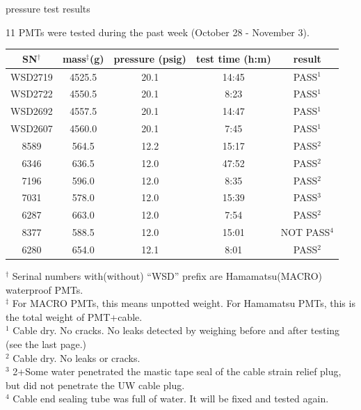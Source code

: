 \documentclass{beamer}
\begin{document}
\begin{frame}{pressure test results}
	\begin{center}
		\small
		11 PMTs were tested during the past week (October 28 - November 3).
	\end{center}
\begin{table}
\small
{}
\begin{tabular}{c|c|c|c|c}
	SN$^\dagger$ & mass$^\ddag$(g) & pressure (psig) & test time (h:m) & result \\
	\hline
	WSD2719 & 4525.5 & 20.1 & 14:45 & PASS$^1$ \\

	WSD2722 & 4550.5 & 20.1 & 8:23 & PASS$^1$ \\

	WSD2692 & 4557.5 & 20.1 & 14:47 & PASS$^1$ \\

	WSD2607 & 4560.0 & 20.1 & 7:45 & PASS$^1$ \\

	8589 & 564.5 & 12.2 & 15:17 & PASS$^2$ \\

	6346 & 636.5 & 12.0 & 47:52 & PASS$^2$ \\

	7196 & 596.0 & 12.0 & 8:35 & PASS$^2$ \\

	7031 & 578.0 & 12.0 & 15:39 & PASS$^3$ \\

	6287 & 663.0 & 12.0 & 7:54 & PASS$^2$ \\

	8377 & 588.5 & 12.0 & 15:01 & NOT PASS$^4$ \\

	6280 & 654.0 & 12.1 & 8:01 & PASS$^2$ \\

\end{tabular}
\end{table}
	\tiny
	$^\dagger$ Serinal numbers with(without) ``WSD'' prefix are Hamamatsu(MACRO) waterproof PMTs. \\
	$^\ddag$ For MACRO PMTs, this means unpotted weight. For Hamamatsu PMTs, this is the total
			weight of PMT+cable.\\
	$^1$ Cable dry. No cracks. No leaks detected by weighing before and after testing
		(see the last page.)\\
	$^2$ Cable dry. No leaks or cracks.\\
	$^3$ 2+Some water penetrated the mastic tape seal of the cable
		strain relief plug, but did not penetrate the UW cable plug.\\
	$^4$ Cable end sealing tube was full of water. It will be fixed and tested again.


\end{frame}
\end{document}
